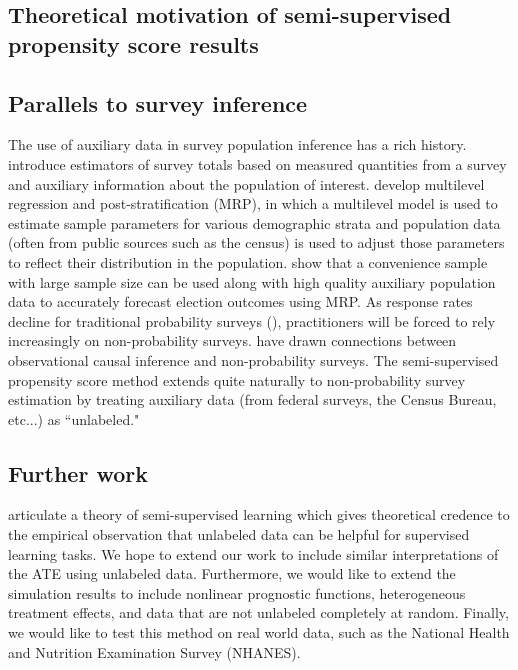 \documentclass[aos]{imsart}
\begin{document}
\subsection{Theoretical motivation of semi-supervised propensity score results}

\subsection{Parallels to survey inference}

The use of auxiliary data in survey population inference has a rich history. \cite{horvitz1952generalization} 
introduce estimators of survey totals based on measured quantities from a survey and auxiliary information about the population of interest.
\cite{GelmanLittle97} develop multilevel regression and post-stratification (MRP), 
in which a multilevel model is used to estimate sample parameters for various demographic strata and population data 
(often from public sources such as the census) is used to adjust those parameters to reflect their distribution in the population. 
\cite{WANG2015980} show that a convenience sample with large sample size can be used along with 
high quality auxiliary population data to accurately forecast election outcomes using MRP. 
As response rates decline for traditional probability surveys (\cite{kennedy2019response}), 
practitioners will be forced to rely increasingly on non-probability surveys.
\cite{mkks2017} have drawn connections between observational causal inference and non-probability surveys. 
The semi-supervised propensity score method extends quite naturally to non-probability survey estimation 
by treating auxiliary data (from federal surveys, the Census Bureau, etc...) as ``unlabeled."

\subsection{Further work}

\cite{belkin2006manifold} articulate a theory of semi-supervised learning which gives theoretical credence to the empirical observation 
that unlabeled data can be helpful for supervised learning tasks. We hope to extend our work to include similar interpretations of the ATE using unlabeled data. Furthermore, we would like to extend the simulation results to include nonlinear prognostic functions, heterogeneous treatment 
effects, and data that are not unlabeled completely at random.
Finally, we would like to test this method on real world data, such as the National Health and Nutrition Examination Survey (NHANES). 

 


\end{document}

